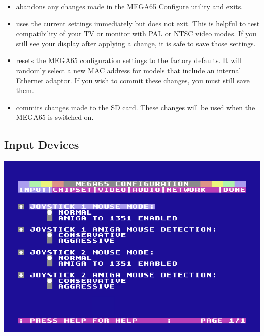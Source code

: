 \begin{itemize}
  \item {} abandons any changes made in the MEGA65 Configure utility and exits.
  \item {} uses the current settings immediately but does not exit. This is helpful to test compatibility of your TV or monitor with PAL or NTSC video modes. If you still see your display after applying a change, it is safe to save those settings.
  \item {} resets the MEGA65 configuration settings to the factory defaults. It will randomly select a new MAC address for models that include an internal Ethernet adaptor. If you wish to commit these changes, you must still save them.
  \item {} commits changes made to the SD card. These changes will be used when the MEGA65 is switched on.
\end{itemize}

\subsection{Input Devices}

\begin{center}
\includegraphics[width=0.7\linewidth]{images/ss-m65config-1.png}
\end{center}

